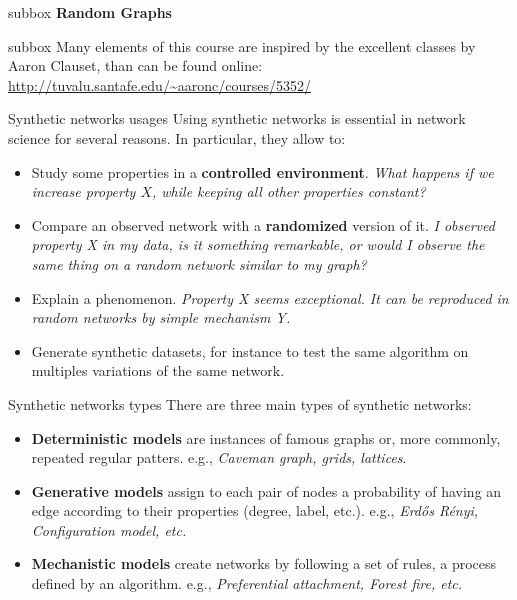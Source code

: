 \begin{subbox}{subbox}{}
    \centering
    \Large{\textbf{Random Graphs}}
\end{subbox}

\begin{subbox}{subbox}{}
    \centering
    Many elements of this course are inspired by the excellent classes by Aaron Clauset, than can be found online:  \url{ http://tuvalu.santafe.edu/~aaronc/courses/5352/}  
\end{subbox}

\begin{textbox}{Synthetic networks usages}
    Using synthetic networks is essential in network science for several reasons. In particular, they allow to:
    \begin{itemize}
        \item Study some properties in a \textbf{controlled environment}. \textit{What happens if we increase property $X$, while keeping all other properties constant?}
        \item Compare an observed network with a \textbf{randomized} version of it. \textit{I observed property X in my data, is it something remarkable, or would I observe the same thing on a random network similar to my graph?}
        \item Explain a phenomenon. \textit{Property X seems exceptional. It can be reproduced in random networks by simple mechanism Y.}
        \item Generate synthetic datasets, for instance to test the same algorithm on multiples variations of the same network.
    \end{itemize}
\end{textbox}

\begin{textbox}{Synthetic networks types}
    There are three main types of synthetic networks:
    \begin{itemize}
        \item \textbf{Deterministic models} are instances of famous graphs or, more commonly, repeated regular patters. e.g., \textit{Caveman graph, grids, lattices}.
        \item \textbf{Generative models} assign to each pair of nodes a probability of having an edge according to their properties (degree, label, etc.). e.g., \textit{Erdős Rényi, Configuration model, etc.}
        \item \textbf{Mechanistic models} create networks by following a set of rules, a process defined by an algorithm. e.g., \textit{Preferential attachment, Forest fire, etc.}
    \end{itemize}
\end{textbox}

